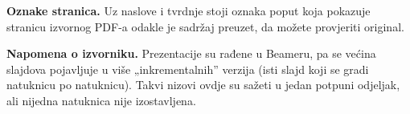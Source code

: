 \documentclass[11pt,a4paper,oneside]{report}
\begin{document}
\textbf{Oznake stranica.} Uz naslove i tvrdnje stoji oznaka poput 
koja pokazuje stranicu izvornog PDF-a odakle je sadržaj preuzet, da možete
provjeriti original.

\textbf{Napomena o izvorniku.} Prezentacije su rađene u Beameru, pa se većina
slajdova pojavljuje u više „inkrementalnih” verzija (isti slajd koji se gradi
natuknicu po natuknicu). Takvi nizovi ovdje su sažeti u jedan potpuni
odjeljak, ali nijedna natuknica nije izostavljena.

\clearpage
\tableofcontents
\clearpage









\end{document}
